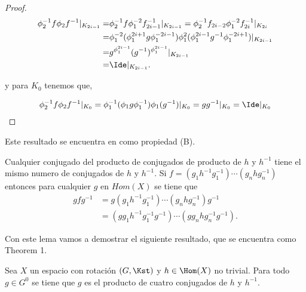 \begin{proof}
\begin{align*}
\phi_2^{-1}f\phi_2f^{-1}|_{K_{2i-1}} = & \phi_2^{-1}f \phi_1^{-2} f_{2i-1}^{-1}|_{K_{2i-1}} = \phi_2^{-1}f_{2i-2} \phi_1^{-2} f_{2i}^{-1}|_{K_{2i}} \\
= & \phi_1^{-2}(\phi_1^{2i+1}g \phi_1^{-2i-1})\phi_1^2(\phi_1^{2i-1}g^{-1}\phi_1^{-2i+1})|_{K_{2i-1}} \\
= &  g^{\phi_1^{2i-1}}(g^{-1})^{\phi_1^{2i-1}}|_{K_{2i-1}}\\
= & \Ide|_{K_{2i-1}}.
\end{align*}

y para $K_0$ tenemos que,

\begin{align*}
\phi_2^{-1}f\phi_2f^{-1}|_{K_0} = \phi_1^{-1}(\phi_1 g \phi_1^{-1})\phi_1(g^{-1})|_{K_0}=gg^{-1}|_{K_0}=\Ide|_{K_0}
\end{align*}

\end{proof}

Este resultado se encuentra en \cite{ander} como propiedad (B).

\begin{ob}\label{ob:numero_conjugados}
Cualquier conjugado del producto de conjugados de producto de $h$ y $h^{-1}$ tiene el mismo numero de conjugados de $h$ y $h^{-1}$. Si $f=(g_1 h^{-1} g_1^{-1}) \cdots(g_n h g_n^{-1})$ entonces para cualquier $g$ en $Hom(X)$ se tiene que
\begin{align*}
g f g^{-1} & = g(g_1 h^{-1} g_1^{-1}) \cdots (g_n h g_n^{-1})g^{-1}\\
&= (gg_1 h^{-1} g_1^{-1}g^{-1})\cdots(gg_n h g_n^{-1}g^{-1}).
\end{align*} 
\end{ob}	  
 
Con este lema vamos a demostrar el siguiente resultado, que se encuentra como \cite{ander} Theorem 1.

\begin{te}
Sea $X$ un espacio con rotación $(G,\Kst)$ y $h \in \Hom(X)$ no trivial. Para todo $g \in G^0$ se tiene que $g$ es el producto de cuatro conjugados de $h$ y $h^{-1}$.
\end{te}



